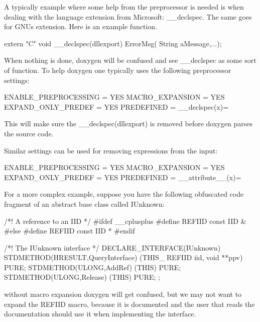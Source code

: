 A typically example where some help from the preprocessor is needed is when dealing with the language extension from Microsoft\+: {\ttfamily \+\_\+\+\_\+declspec}. The same goes for G\+NU\textquotesingle{}s {} extension. Here is an example function.

\begin{DoxyVerb}extern "C" void __declspec(dllexport) ErrorMsg( String aMessage,...);
\end{DoxyVerb}


When nothing is done, doxygen will be confused and see {\ttfamily \+\_\+\+\_\+declspec} as some sort of function. To help doxygen one typically uses the following preprocessor settings\+:

\begin{DoxyVerb}ENABLE_PREPROCESSING   = YES
MACRO_EXPANSION        = YES
EXPAND_ONLY_PREDEF     = YES
PREDEFINED             = __declspec(x)=
\end{DoxyVerb}


This will make sure the {\ttfamily \+\_\+\+\_\+declspec(dllexport)} is removed before doxygen parses the source code.

Similar settings can be used for removing {} expressions from the input\+:

\begin{DoxyVerb}ENABLE_PREPROCESSING   = YES
MACRO_EXPANSION        = YES
EXPAND_ONLY_PREDEF     = YES
PREDEFINED             = __attribute__(x)=
\end{DoxyVerb}


For a more complex example, suppose you have the following obfuscated code fragment of an abstract base class called {\ttfamily I\+Unknown\+:} 

\begin{DoxyVerb}/*! A reference to an IID */
#ifdef __cplusplus
#define REFIID const IID &
#else
#define REFIID const IID *
#endif


/*! The IUnknown interface */
DECLARE_INTERFACE(IUnknown)
{
  STDMETHOD(HRESULT,QueryInterface) (THIS_ REFIID iid, void **ppv) PURE;
  STDMETHOD(ULONG,AddRef) (THIS) PURE;
  STDMETHOD(ULONG,Release) (THIS) PURE;
};
\end{DoxyVerb}


without macro expansion doxygen will get confused, but we may not want to expand the {\ttfamily R\+E\+F\+I\+ID} macro, because it is documented and the user that reads the documentation should use it when implementing the interface.

